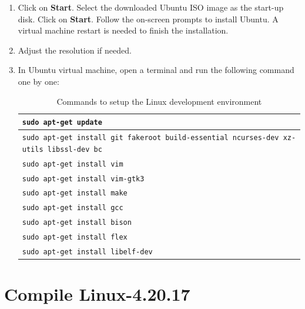 \documentclass[11pt,letterpaper,titlepage]{article}
\begin{document}
\begin{enumerate}
    \item Click on \textbf{Start}. Select the downloaded Ubuntu ISO image as the start-up disk. Click on \textbf{Start}. Follow the on-screen prompts to install Ubuntu. A virtual machine restart is needed to finish the installation.
    
    \item Adjust the resolution if needed.
    
    \item In Ubuntu virtual machine, open a terminal and run the following command one by one:
    
    \begin{table}[ht]
    \begin{tabular}{l}
    \toprule
    \texttt{sudo apt-get update}                                                                  \\ \midrule
    \texttt{sudo apt-get install git fakeroot build-essential ncurses-dev xz-utils libssl-dev bc} \\ \midrule
    \texttt{sudo apt-get install vim}                                                             \\ \midrule
    \texttt{sudo apt-get install vim-gtk3}                                                        \\ \midrule
    \texttt{sudo apt-get install make}                                                            \\ \midrule
    \texttt{sudo apt-get install gcc}                                                             \\ \midrule
    \texttt{sudo apt-get install bison}                                                           \\ \midrule
    \texttt{sudo apt-get install flex}                                                            \\ \midrule
    \texttt{sudo apt-get install libelf-dev}                                                      \\ \bottomrule           
    \end{tabular}
    \caption{Commands to setup the Linux development environment}
    \end{table}
    
\end{enumerate}

\section{Compile Linux-4.20.17}
\end{document}
